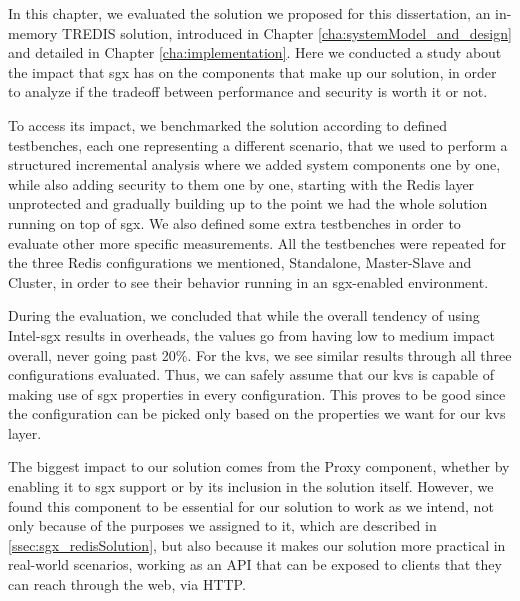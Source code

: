In this chapter, we evaluated the solution we proposed for this dissertation, an in-memory TREDIS solution, introduced in Chapter \ref{cha:systemModel_and_design} and detailed in Chapter \ref{cha:implementation}. Here we conducted a study about the impact that \gls{sgx} has on the components that make up our solution, in order to analyze if the tradeoff between performance and security is worth it or not. 

To access its impact, we benchmarked the solution according to defined testbenches, each one representing a different scenario, that we used to perform a structured incremental analysis where we added system components one by one, while also adding security to them one by one, starting with the Redis layer unprotected and gradually building up to the point we had the whole solution running on top of \gls{sgx}. We also defined some extra testbenches in order to evaluate other more specific measurements. All the testbenches were repeated for the three Redis configurations we mentioned, Standalone, Master-Slave and Cluster, in order to see their behavior running in an \gls{sgx}-enabled environment.

During the evaluation, we concluded that while the overall tendency of using Intel-\gls{sgx} results in overheads, the values go from having low to medium impact overall, never going past 20\%. For the \gls{kvs}, we see similar results through all three configurations evaluated. Thus, we can safely assume that our \gls{kvs} is capable of making use of \gls{sgx} properties in every configuration. This proves to be good since the configuration can be picked only based on the properties we want for our \gls{kvs} layer.

The biggest impact to our solution comes from the Proxy component, whether by enabling it to \gls{sgx} support or by its inclusion in the solution itself. However, we found this component to be essential for our solution to work as we intend, not only because of the purposes we assigned to it, which are described in \ref{ssec:sgx_redisSolution}, but also because it makes our solution more practical in real-world scenarios, working as an API that can be exposed to clients that they can reach through the web, via HTTP.

